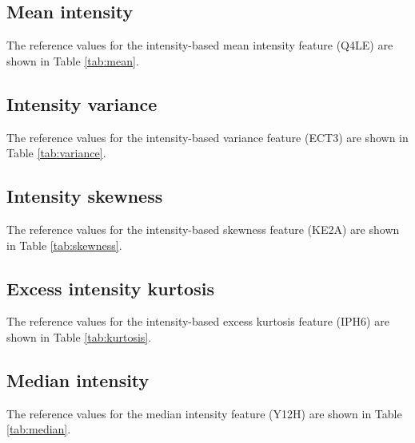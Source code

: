 \documentclass[fleqn,a4paper,oneside,openany]{book}
\newcommand\textid[1]{{\normalsize{\idfont #1}}}
\begin{document}
\subsection{Mean intensity}

The reference values for the intensity-based mean intensity feature (\textid{Q4LE}) are shown in Table \ref{tab:mean}.

\subsection{Intensity variance}

The reference values for the intensity-based variance feature (\textid{ECT3}) are shown in Table \ref{tab:variance}.

\begin{minipage}[l]{0.45\textwidth}

\end{minipage}
\quad
\begin{minipage}[r]{0.45\textwidth}

\end{minipage}
\FloatBarrier

\subsection{Intensity skewness}

The reference values for the intensity-based skewness feature (\textid{KE2A}) are shown in Table \ref{tab:skewness}.

\subsection{Excess intensity kurtosis}

The reference values for the intensity-based excess kurtosis feature (\textid{IPH6}) are shown in Table \ref{tab:kurtosis}.

\begin{minipage}[l]{0.45\textwidth}

\end{minipage}
\quad
\begin{minipage}[r]{0.45\textwidth}

\end{minipage}
\FloatBarrier

\subsection{Median intensity}

The reference values for the median intensity feature (\textid{Y12H}) are shown in Table \ref{tab:median}.
\end{document}
